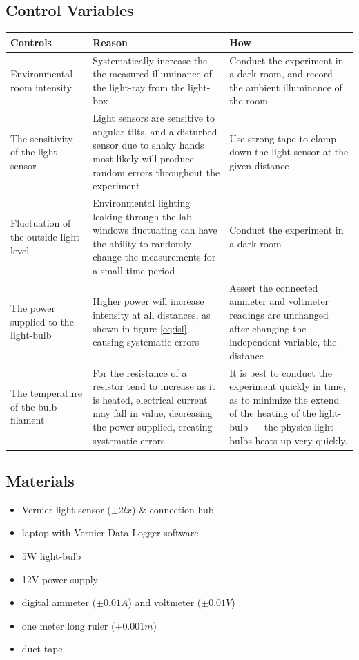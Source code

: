 \documentclass[a4paper,12pt]{article}
\begin{document}
\subsection{Control Variables}

\begin{longtable}{P{0.2\textwidth}|P{0.35\textwidth}|P{0.35\textwidth}}
Controls & Reason & How\\\hline
Environmental room intensity & Systematically increase the the measured illuminance of the light-ray from the light-box & Conduct the experiment in a dark room, and record the ambient illuminance of the room \\

The sensitivity of the light sensor & Light sensors are sensitive to angular tilts, and a disturbed sensor due to shaky hands most likely will produce random errors throughout the experiment & Use strong tape to clamp down the light sensor at the given distance\\

Fluctuation of the outside light level & Environmental lighting leaking through the lab windows fluctuating can have the ability to randomly change the measurements for a small time period & Conduct the experiment in a dark room \\

The power supplied to the light-bulb & Higher power will increase intensity at all distances, as shown in figure \ref{eq:isl}, causing systematic errors & Assert the connected ammeter and voltmeter readings are unchanged after changing the independent variable, the distance\\

The temperature of the bulb filament & For the resistance of a resistor tend to increase as it is heated, electrical current may fall in value, decreasing the power supplied, creating systematic errors & It is best to conduct the experiment quickly in time, as to minimize the extend of the heating of the light-bulb --- the physics light-bulbs heats up very quickly.

\end{longtable}

\newpage

\subsection{Materials}
\begin{itemize}
 \item Vernier light sensor ($\pm 2\si{lx}$) \parencite{vernier_manual} \& connection hub
 \item laptop with Vernier Data Logger software
 \item 5W light-bulb
 \item 12V power supply
 \item digital ammeter ($\pm 0.01\si{A}$) and voltmeter ($\pm 0.01\si{V}$)
 \item one meter long ruler ($\pm 0.001\si{m}$)
 \item duct tape
 \end{itemize}
\end{document}
